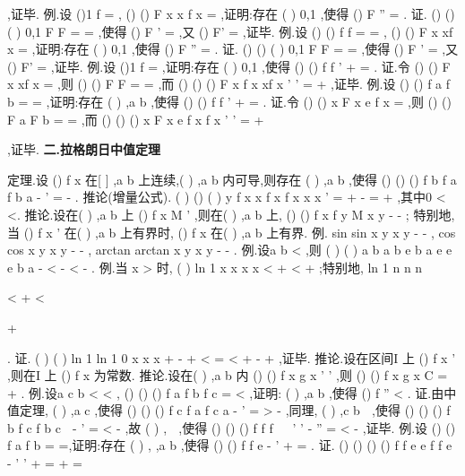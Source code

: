 \neq 
,证毕. 
\textcolor{lyred}{例}.设
()1
f
=
,
()
()
F x
x f x
=
,证明:存在
(
)
0,1
\psi \in 
,使得
()
F
\psi 
''
=
. 
证.
()
()
(
)
0,1
F
F
\eta 
=
=
\Rightarrow \exists \in 
,使得
()
F \eta 
'
=
,又
()
F'
=
,证毕. 
\textcolor{lyred}{例}.设
()
()
f
f
=
=
,
()
()
F x
xf x
=
,证明:存在
(
)
0,1
\psi \in 
,使得
()
F
\psi 
''
=
. 
证.
()
()
(
)
0,1
F
F
\eta 
=
=
\Rightarrow \exists \in 
,使得
()
F \eta 
'
=
,又
()
F'
=
,证毕. 
\textcolor{lyred}{例}.设
()1
f
=
,证明:存在
(
)
0,1
\psi \in 
,使得
()
()
f
f
\psi 
\psi 
\psi 
'
+
=
. 
证.令
()
()
F x
xf x
=
,则
()
()
F
F
=
=
,而
()
()
()
F
x
f x
xf
x
'
'
=
+
,证毕. 
\textcolor{lyred}{例}.设
()
()
f a
f b
=
=
,证明:存在
(
)
,a b
\psi \in 
,使得
()
()
f
f
\psi 
\psi 
'
+
=
. 
证.令
()
()
x
F x
e f x
=
,则
()
()
F a
F b
=
=
,而
()
()
()
x
F
x
e
f x
f
x
'
'
=
+



,证毕. 
\vspace{4pt}
{\bfseries \textcolor{lyred}{二.拉格朗日中值定理}}

\textcolor{lyred}{定理}.设
()
f x 在[
]
,a b 上连续,(
)
,a b 内可导,则存在
(
)
,a b
\psi \in 
,使得 
()
()
()
f b
f a
f
b
a
\psi 
-
'
=
-
. 
\textcolor{lyred}{推论(增量公式)}.
(
)
()
(
)
y
f x
x
f x
f
x
x
x
\Delta 
\Delta 
\theta \Delta 
\Delta 
'
=
+
-
=
+
,其中0
\theta 
<
<. 
\textcolor{lyred}{推论}.设在(
)
,a b 上
()
f
x
M
'
\le 
,则在(
)
,a b 上,
()
()
f x
f
y
M x
y
-
\le 
-
; 
特别地,当
()
f
x
'
在(
)
,a b 上有界时,
()
f x 在(
)
,a b 上有界. 
\textcolor{lyred}{例}. sin
sin
x
y
x
y
-
\le 
-
, cos
cos
x
y
x
y
-
\le 
-
, arctan
arctan
x
y
x
y
-
\le 
-
. 
\textcolor{lyred}{例}.设a
b
<
,则
(
)
(
)
a
b
a
b
e
b
a
e
e
e
b
a
-
<
-
<
-
. 
\textcolor{lyred}{例}.当
x >
时,
(
)
ln 1
x
x
x
x <
+
<
+
;特别地,
ln 1
n
n
n


<
+
<


+


. 
证.
(
)
(
)
ln 1
ln 1 0
x
x
x
\psi 
+
-
+
<
=
<
+
-
+
,证毕. 
\textcolor{lyred}{推论}.设在区间I 上
()
f
x
'
\equiv 
,则在I 上
()
f x 为常数. 
\textcolor{lyred}{推论}.设在(
)
,a b 内
()
()
f
x
g
x
'
'
\equiv 
,则
()
()
f x
g x
C
=
+
. 
\textcolor{lyred}{例}.设a
c
b
<
<
,
()
()
()
f a
f b
f c
=
<
,证明:
(
)
,a b
\psi 
\exists \in 
,使得
()
f
\psi 
''
<
. 
证.由中值定理,
(
)
,a c
\eta 
\exists \in 
,使得
()
()
()
f c
f a
f
c
a
\eta 
-
'
=
>
-
,同理,
(
)
,c b

\exists 
\in 
,使得 
()
()
()
f b
f c
f
b
c

-
'
=
<
-
,故
(
)
,
\psi 
\eta 
\exists \in 
,使得
()
()
()
f
f
f

\eta 
\psi 

\eta 
'
'
-
''
=
<
-
,证毕. 
\textcolor{lyred}{例}.设
()
()
f a
f b
=
=,证明:存在
(
)
,
,a b
\psi \eta \in 
,使得
()
()
f
f
e\psi \eta 
\eta 
\eta 
-
'
+
=
. 
证.
()
()
()
()
f
f
e
e
f
f
e
\psi \eta 
\eta 
\psi 
\eta 
\eta 
\eta 
\eta 
-
'
'
+
=
\Leftrightarrow 
+
=




